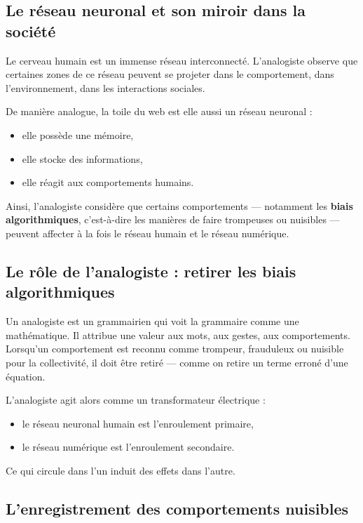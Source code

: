 \documentclass[12pt,oneside]{article}
\begin{document}
\subsection{Le réseau neuronal et son miroir dans la société}

Le cerveau humain est un immense réseau interconnecté.  
L'analogiste observe que certaines zones de ce réseau peuvent se projeter dans le comportement, dans l'environnement, dans les interactions sociales.

De manière analogue, la toile du web est elle aussi un réseau neuronal :  
\begin{itemize}
    \item elle possède une mémoire,  
    \item elle stocke des informations,  
    \item elle réagit aux comportements humains.  
\end{itemize}

Ainsi, l'analogiste considère que certains comportements --- notamment les \textbf{biais algorithmiques}, c'est-à-dire les manières de faire trompeuses ou nuisibles --- peuvent affecter à la fois le réseau humain et le réseau numérique.

\subsection{Le rôle de l'analogiste : retirer les biais algorithmiques}

Un analogiste est un grammairien qui voit la grammaire comme une mathématique.  
Il attribue une valeur aux mots, aux gestes, aux comportements.  
Lorsqu'un comportement est reconnu comme trompeur, frauduleux ou nuisible pour la collectivité, il doit être retiré --- comme on retire un terme erroné d'une équation.

L'analogiste agit alors comme un transformateur électrique :  
\begin{itemize}
    \item le réseau neuronal humain est l'enroulement primaire,  
    \item le réseau numérique est l'enroulement secondaire.  
\end{itemize}

Ce qui circule dans l'un induit des effets dans l'autre.

\subsection{L'enregistrement des comportements nuisibles}
\end{document}
